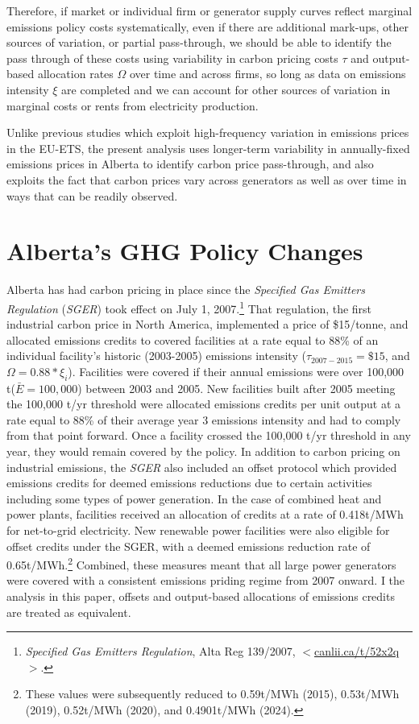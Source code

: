 \documentclass[12pt]{article}
\newcommand{\coe}{\text{CO$_2$e}}
\begin{document}
Therefore, if market or individual firm or generator supply curves reflect marginal emissions policy costs systematically, even if there are additional mark-ups, other sources of variation, or partial pass-through, we should be able to identify the pass through of these costs using variability in carbon pricing costs $\tau$ and output-based allocation rates $\Omega$ over time and across firms, so long as data on emissions intensity $\xi$ are completed and we can account for other sources of variation in marginal costs or rents from electricity production.

Unlike previous studies which exploit high-frequency variation in emissions prices in the EU-ETS, the present analysis uses longer-term variability in annually-fixed emissions prices in Alberta to identify carbon price pass-through, and also exploits the fact that carbon prices vary across generators as well as over time in ways that can be readily observed.


\section{Alberta's GHG Policy Changes}\label{sec:policy}

Alberta has had carbon pricing in place since the \emph{Specified Gas Emitters Regulation} (\emph{SGER}) took effect on July 1, 2007.\footnote{\textit{Specified Gas Emitters Regulation}, Alta Reg 139/2007, $<$\url{canlii.ca/t/52x2q}$>$.} That regulation, the first industrial carbon price in North America, implemented a price of \$15/tonne, and allocated emissions credits to covered facilities at a rate equal to 88\% of an individual facility's historic (2003-2005) emissions intensity ($\tau_{2007-2015}=\$15$, and $\Omega=0.88*\xi_i$). Facilities were covered if their annual emissions were over 100,000 t\coe ($\bar{E}=100,000$) between 2003 and 2005. New facilities built after 2005 meeting the 100,000 t\coe/yr threshold were allocated emissions credits per unit output at a rate equal to 88\% of their average year 3 emissions intensity and had to comply from that point forward. Once a facility crossed the 100,000 t\coe/yr threshold in any year, they would remain covered by the policy. In addition to carbon pricing on industrial emissions, the \emph{SGER} also included an offset protocol which provided emissions credits for deemed emissions reductions due to certain activities including some types of power generation. In the case of combined heat and power plants, facilities received an allocation of credits at a rate of 0.418t/MWh for net-to-grid electricity. New renewable power facilities were also eligible for offset credits under the SGER, with a deemed emissions reduction rate of 0.65t/MWh.\footnote{These values were subsequently reduced to 0.59t/MWh (2015), 0.53t/MWh (2019), 0.52t/MWh (2020), and 0.4901t/MWh (2024).} Combined, these measures meant that all large power generators were covered with a consistent emissions priding regime from 2007 onward. I the analysis in this paper, offsets and output-based allocations of emissions credits are treated as equivalent.
\end{document}
